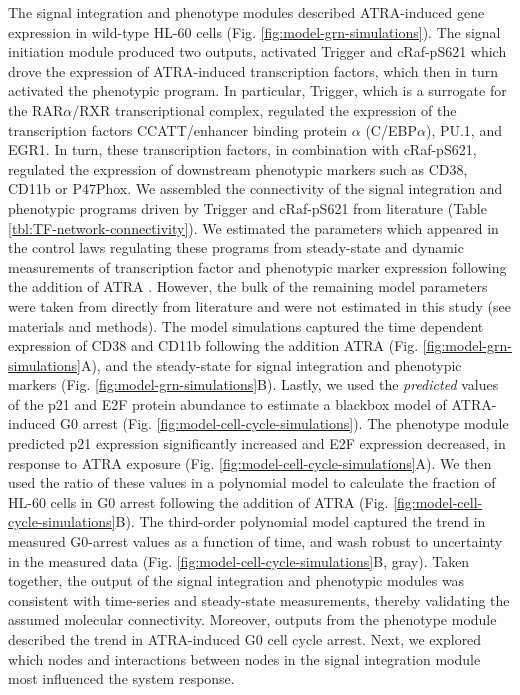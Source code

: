 \documentclass[12pt]{article}
\begin{document}
The signal integration and phenotype modules described ATRA-induced gene expression in wild-type HL-60 cells (Fig. \ref{fig:model-grn-simulations}).
The signal initiation module produced two outputs, activated Trigger and cRaf-pS621 which drove the expression of ATRA-induced transcription factors,
which then in turn activated the phenotypic program. In particular, Trigger, which is a surrogate for the RAR$\alpha$/RXR transcriptional complex,
regulated the expression of the transcription factors CCATT/enhancer binding protein $\alpha$ (C/EBP$\alpha$), PU.1, and EGR1.
In turn, these transcription factors, in combination with cRaf-pS621, regulated the expression of downstream phenotypic markers such as CD38, CD11b or P47Phox.
We assembled the connectivity of the signal integration and phenotypic programs driven by Trigger and cRaf-pS621 from literature (Table \ref{tbl:TF-network-connectivity}).
We estimated the parameters which appeared in the control laws regulating these programs
from steady-state and dynamic measurements of transcription factor and phenotypic marker expression following the addition of ATRA \cite{Jensen:2013aa,Jensen:2014aa,Jensen:2015ab,Jensen:2015aa}.
However, the bulk of the remaining model parameters were taken from directly from literature \cite{Milo:2010aa} and were not estimated in this study (see materials and methods).
The model simulations captured the time dependent expression of CD38 and CD11b following the addition ATRA (Fig. \ref{fig:model-grn-simulations}A),
and the steady-state for signal integration and phenotypic markers (Fig. \ref{fig:model-grn-simulations}B).
Lastly, we used the \textit{predicted} values of the p21 and E2F protein abundance to estimate a blackbox model of ATRA-induced G0 arrest (Fig. \ref{fig:model-cell-cycle-simulations}).
The phenotype module predicted p21 expression significantly increased and E2F expression decreased, in response to ATRA exposure (Fig. \ref{fig:model-cell-cycle-simulations}A).
We then used the ratio of these values in a polynomial model to calculate the fraction of HL-60 cells in G0 arrest following the addition of ATRA (Fig. \ref{fig:model-cell-cycle-simulations}B).
The third-order polynomial model captured the trend in measured G0-arrest values as a function of time, and wash robust to uncertainty in the measured data (Fig. \ref{fig:model-cell-cycle-simulations}B, gray).
Taken together, the output of the signal integration and phenotypic modules was consistent with time-series and steady-state measurements, thereby validating the assumed molecular connectivity.
Moreover, outputs from the phenotype module described the trend in ATRA-induced G0 cell cycle arrest.
Next, we explored which nodes and interactions between nodes in the signal integration module most influenced the system response.
\end{document}
